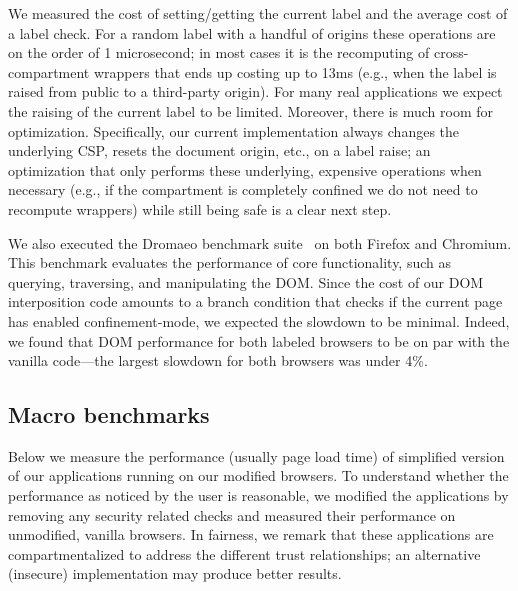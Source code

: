 
We measured the cost of setting/getting the current label and the
average cost of a label check.
%
For a random label with a handful of origins these operations are on
the order of 1 microsecond; in most cases it is the recomputing of
cross-compartment wrappers that ends up costing up to 13ms (e.g., when
the label is raised from public to a third-party origin).
%
For many real applications we expect the raising of the current label
to be limited.
%
Moreover, there is much room for optimization.
%
Specifically, our current implementation always changes the underlying
CSP, resets the document origin, etc., on a label raise;
%
an optimization that only performs these underlying, expensive
operations when necessary (e.g., if the compartment is completely
confined we do not need to recompute wrappers) while still being safe
is a clear next step.
 
We also executed the Dromaeo benchmark suite~\cite{dromaeo} on both
Firefox and Chromium.
%
This benchmark evaluates the performance of core functionality,
such as querying, traversing, and manipulating the DOM.
%
Since the cost of our DOM interposition code amounts to a branch
condition that checks if the current page has enabled
confinement-mode, we expected the slowdown to be minimal. Indeed, we
found that DOM performance for both labeled browsers to be on par with
the vanilla code---the largest slowdown for both browsers was under
4\%.

\subsection{Macro benchmarks}
\label{sec:eval:macro}

Below we measure the performance (usually page load time) of
simplified version of our applications running on our modified
browsers.
%
To understand whether the performance as noticed by the user is
reasonable, we modified the applications by removing any security
related checks and measured their performance on unmodified, vanilla
browsers.
%
In fairness, we remark that these applications are compartmentalized
to address the different trust relationships; an alternative
(insecure) implementation may produce better results.

